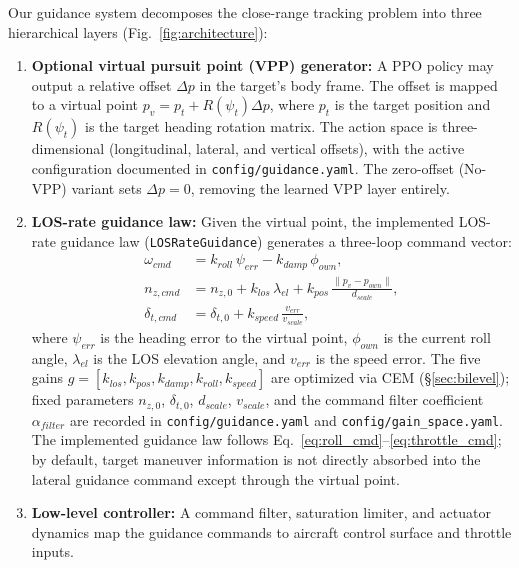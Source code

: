 \documentclass[conference]{IEEEtran}
\begin{document}
Our guidance system decomposes the close-range tracking problem into three hierarchical layers (Fig.~\ref{fig:architecture}):
\begin{enumerate}
    \item \textbf{Optional virtual pursuit point (VPP) generator:} A PPO policy may output a relative offset $\Delta p$ in the target's body frame. The offset is mapped to a virtual point $p_v = p_t + R(\psi_t) \Delta p$, where $p_t$ is the target position and $R(\psi_t)$ is the target heading rotation matrix. The action space is three-dimensional (longitudinal, lateral, and vertical offsets), with the active configuration documented in \texttt{config/guidance.yaml}. The zero-offset (No-VPP) variant sets $\Delta p = 0$, removing the learned VPP layer entirely.
    \item \textbf{LOS-rate guidance law:} Given the virtual point, the implemented LOS-rate guidance law (\texttt{LOSRateGuidance}) generates a three-loop command vector:
    \begin{align}
        \omega_{cmd} &= k_{roll}\,\psi_{err} - k_{damp}\,\phi_{own}, \label{eq:roll_cmd}\\
        n_{z,cmd} &= n_{z,0} + k_{los}\,\lambda_{el} + k_{pos}\,\frac{\|p_v - p_{own}\|}{d_{scale}}, \label{eq:nz_cmd}\\
        \delta_{t,cmd} &= \delta_{t,0} + k_{speed}\,\frac{v_{err}}{v_{scale}}, \label{eq:throttle_cmd}
    \end{align}
    where $\psi_{err}$ is the heading error to the virtual point, $\phi_{own}$ is the current roll angle, $\lambda_{el}$ is the LOS elevation angle, and $v_{err}$ is the speed error. The five gains $g = [k_{los}, k_{pos}, k_{damp}, k_{roll}, k_{speed}]$ are optimized via CEM (\S\ref{sec:bilevel}); fixed parameters $n_{z,0}$, $\delta_{t,0}$, $d_{scale}$, $v_{scale}$, and the command filter coefficient $\alpha_{filter}$ are recorded in \texttt{config/guidance.yaml} and \texttt{config/gain\_space.yaml}. The implemented guidance law follows Eq.~\eqref{eq:roll_cmd}--\eqref{eq:throttle_cmd}; by default, target maneuver information is not directly absorbed into the lateral guidance command except through the virtual point.
    \item \textbf{Low-level controller:} A command filter, saturation limiter, and actuator dynamics map the guidance commands to aircraft control surface and throttle inputs.
\end{enumerate}


\end{document}
